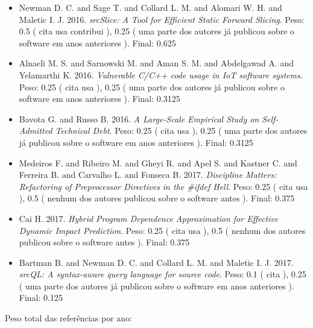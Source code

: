 \begin{itemize}
\item Newman D. C. and Sage T. and Collard L. M. and Alomari W. H. and Maletic I. J.
      2016.
        \textit{ srcSlice: A Tool for Efficient Static Forward Slicing}.
      Peso:
      0.5 (
          cita
          usa
          contribui
      ),
      0.25 (
uma parte dos autores já publicou sobre o software em anos anteriores
      ).
      Final:
      0.625

\item Alnaeli M. S. and Sarnowski M. and Aman S. M. and Abdelgawad A. and Yelamarthi K.
      2016.
        \textit{ Vulnerable C/C++ code usage in IoT software systems}.
      Peso:
      0.25 (
          cita
          usa
      ),
      0.25 (
uma parte dos autores já publicou sobre o software em anos anteriores
      ).
      Final:
      0.3125

\item Bavota G. and Russo B.
      2016.
        \textit{ A Large-Scale Empirical Study on Self-Admitted Technical Debt}.
      Peso:
      0.25 (
          cita
          usa
      ),
      0.25 (
uma parte dos autores já publicou sobre o software em anos anteriores
      ).
      Final:
      0.3125

\item Medeiros F. and Ribeiro M. and Gheyi R. and Apel S. and Kastner C. and Ferreira B. and Carvalho L. and Fonseca B.
      2017.
        \textit{ Discipline Matters: Refactoring of Preprocessor Directives in the \#ifdef Hell}.
      Peso:
      0.25 (
          cita
          usa
      ),
      0.5 (
nenhum dos autores publicou sobre o software antes
      ).
      Final:
      0.375

\item Cai H.
      2017.
        \textit{ Hybrid Program Dependence Approximation for Effective Dynamic Impact Prediction}.
      Peso:
      0.25 (
          cita
          usa
      ),
      0.5 (
nenhum dos autores publicou sobre o software antes
      ).
      Final:
      0.375

\item Bartman B. and Newman D. C. and Collard L. M. and Maletic I. J.
      2017.
        \textit{ srcQL: A syntax-aware query language for source code}.
      Peso:
      0.1 (
          cita
      ),
      0.25 (
uma parte dos autores já publicou sobre o software em anos anteriores
      ).
      Final:
      0.125

\end{itemize}

Peso total das referências por ano:


